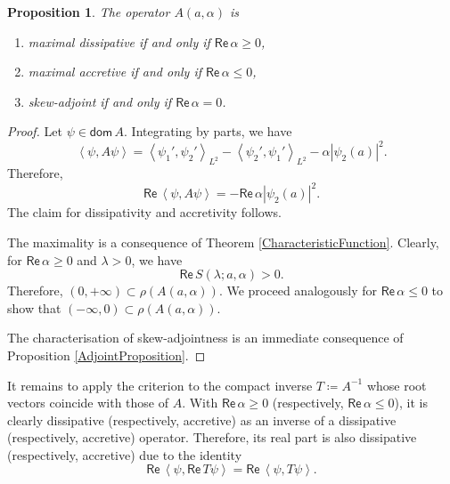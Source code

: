 \documentclass[11pt, a4paper,reqno]{amsart}
\theoremstyle{plain}
\newtheorem{proposition}[theorem]{Proposition}
\theoremstyle{definition}
\theoremstyle{remark}
\newcommand{\inner}[2]{\left\langle{#1}, {#2}\right\rangle}
\renewcommand{\leq}{\leqslant}	\renewcommand{\geq}{\geqslant}
\newcommand{\1}{\mathds 1}
\renewcommand{\Re}{\mathsf{Re}\,}
\newcommand{\Dom}{\mathsf{dom}\,}
\begin{document}
\begin{proposition}
    The operator $A(a,\alpha)$ is
    \begin{enumerate}
        \item maximal dissipative if and only if $\Re \alpha \geq 0$,
        \item maximal accretive if and only if $\Re \alpha \leq 0$,
        \item skew-adjoint if and only if $\Re \alpha = 0$.
    \end{enumerate}
\end{proposition}
\begin{proof}
    Let $\psi \in \Dom A$. Integrating by parts, we have
    \[
    \inner{\psi}{A\psi} = \inner{\psi_1'}{\psi_2'}_{L^2} - \inner{\psi_2'}{\psi_1'}_{L^2} - \alpha|\psi_2(a)|^2.
    \]
    Therefore,
    \[
    \Re\inner{\psi}{A\psi} = -\Re\alpha|\psi_2(a)|^2.
    \]
    The claim for dissipativity and accretivity follows. 
    
    The maximality is a consequence of Theorem \ref{CharacteristicFunction}. Clearly, for $\Re \alpha \geq 0$ and $\lambda > 0$, we have 
    \[
    \Re S(\lambda; a, \alpha) > 0.
    \]
    Therefore, $(0, +\infty) \subset \rho(A(a,\alpha))$. We proceed analogously for $\Re \alpha \leq 0$ to show that $(-\infty, 0) \subset \rho(A(a, \alpha))$.
    
    The characterisation of skew-adjointness is an immediate consequence of Proposition \ref{AdjointProposition}.
\end{proof}


It remains to apply the criterion to the compact inverse $T \coloneqq A^{-1}$ whose root vectors coincide with those of $A$. With $\Re \alpha \geq 0$ (respectively, $\Re \alpha \leq 0$), it is clearly dissipative (respectively, accretive) as an inverse of a dissipative (respectively, accretive) operator. Therefore, its real part is also dissipative (respectively, accretive) due to the identity
\[
\Re \inner{\psi}{\Re T\psi} = \Re \inner{\psi}{T\psi}.
\]
\end{document}
